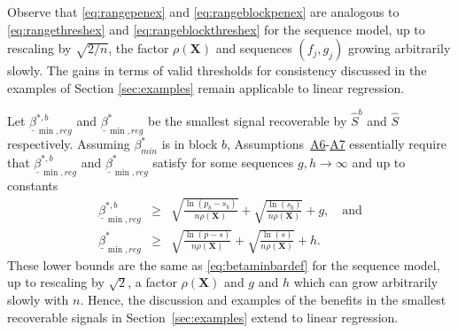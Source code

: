 \documentclass[bj,authoryear]{imsart}
\theoremstyle{plain}
\newcommand{\bs}{\boldsymbol}
\begin{document}
Observe that \eqref{eq:rangepenex} and \eqref{eq:rangeblockpenex} are analogous to \eqref{eq:rangethreshex} and \eqref{eq:rangeblockthreshex} for the sequence model, up to rescaling by $\sqrt{2/n}$, the factor $\rho(\bs X)$ and sequences $(f_j,g_j)$ growing arbitrarily slowly. The gains in terms of valid thresholds for consistency discussed in the examples of Section \ref{sec:examples} remain applicable %
to linear regression. %

Let $\underline{\beta}^{*,b}_{\min,reg}$ and $\underline{\beta}^{*}_{\min,reg}$ be the smallest signal recoverable by $\hat{S}^b$ and $\hat{S}$ respectively.
Assuming $\beta_{min}^*$ is in block $b$, Assumptions~\hyperlink{lab:A6}{A6}-\hyperlink{lab:A7}{A7} essentially require that $\underline{\beta}^{*,b}_{\min,reg}$ and $\underline{\beta}^{*}_{\min,reg}$ satisfy for some sequences $g,h\to\infty$ and up to constants
\begin{eqnarray*}
    \underline{\beta}^{*,b}_{\min,reg}&\geq& \sqrt{\frac{\ln(p_b-s_b)}{ n\rho(\bs X)}} + \sqrt{\frac{\ln(s_b)}{ n\rho(\bs X)}} + g,\quad\text{and}  \\
    \underline{\beta}^{*}_{\min,reg}&\geq& \sqrt{\frac{\ln(p-s)}{ n\rho(\bs X)}} + \sqrt{\frac{\ln(s)}{ n\rho(\bs X)}}  + h.
\end{eqnarray*}
These lower bounds are the same as \eqref{eq:betaminbardef} for the sequence model, up to rescaling by $\sqrt{2}$, a factor $\rho(\bs X)$ and $g$ and $h$ which can grow arbitrarily slowly with $n$. Hence, the discussion and examples of the benefits in the smallest recoverable signals in Section~\ref{sec:examples} extend to linear regression.
\end{document}
